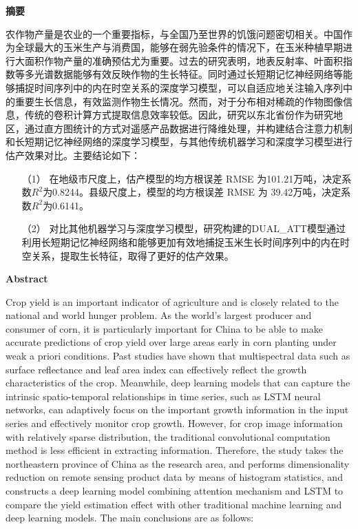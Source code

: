 \cleardoublepage{}
\begin{center}
    \bfseries {} 摘要
\end{center}

\par 农作物产量是农业的一个重要指标，与全国乃至世界的饥饿问题密切相关。中国作为全球最大的玉米生产与消费国，能够在弱先验条件的情况下，在玉米种植早期进行大面积作物产量的准确预估尤为重要。过去的研究表明，地表反射率、叶面积指数等多光谱数据能够有效反映作物的生长特征。同时通过长短期记忆神经网络等能够捕捉时间序列中的内在时空关系的深度学习模型，可以自适应地关注输入序列中的重要生长信息，有效监测作物生长情况。然而，对于分布相对稀疏的作物图像信息，传统的卷积计算方式提取信息效率较低。因此，研究以东北省份作为研究地区，通过直方图统计的方式对遥感产品数据进行降维处理，并构建结合注意力机制和长短期记忆神经网络的深度学习模型，与其他传统机器学习和深度学习模型进行估产效果对比。主要结论如下：

\begin{itemize}
  \item [（1）] 在地级市尺度上，估产模型的均方根误差 RMSE 为101.21万吨，决定系数$R^2$为0.8244。县级尺度上，模型的均方根误差 RMSE 为 39.42万吨，决定系数$R^2$为0.6141。
  \item [（2）] 对比其他机器学习与深度学习模型，研究构建的DUAL\_ATT模型通过利用长短期记忆神经网络和能够更加有效地捕捉玉米生长时间序列中的内在时空关系，提取生长特征，取得了更好的估产效果。
\end{itemize}

\cleardoublepage{}
\begin{center}
    \bfseries {} Abstract
\end{center}

\par Crop yield is an important indicator of agriculture and is closely related to the national and world hunger problem. As the world's largest producer and consumer of corn, it is particularly important for China to be able to make accurate predictions of crop yield over large areas early in corn planting under weak a priori conditions. Past studies have shown that multispectral data such as surface reflectance and leaf area index can effectively reflect the growth characteristics of the crop. Meanwhile, deep learning models that can capture the intrinsic spatio-temporal relationships in time series, such as LSTM neural networks, can adaptively focus on the important growth information in the input series and effectively monitor crop growth. However, for crop image information with relatively sparse distribution, the traditional convolutional computation method is less efficient in extracting information. Therefore, the study takes the northeastern province of China as the research area, and performs dimensionality reduction on remote sensing product data by means of histogram statistics, and constructs a deep learning model combining attention mechanism and LSTM to compare the yield estimation effect with other traditional machine learning and deep learning models. The main conclusions are as follows: 

